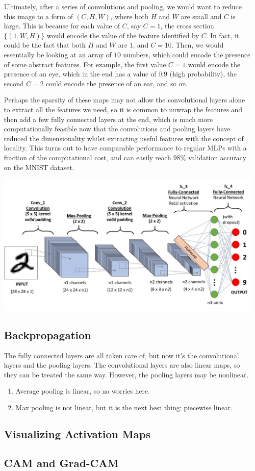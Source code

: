   Ultimately, after a series of convolutions and pooling, we would want to reduce this image to a form of $(C, H, W)$, where both $H$ and $W$ are small and $C$ is large. This is because for each value of $C$, say $C = 1$, the cross section $\{(1, W, H)\}$ would encode the value of the feature identified by $C$. In fact, it could be the fact that both $H$ and $W$ are $1$, and $C = 10$. Then, we would essentially be looking at an array of $10$ numbers, which could encode the presence of some abstract features. For example, the first value $C = 1$ would encode the presence of an eye, which in the end has a value of $0.9$ (high probability), the second $C = 2$ could encode the presence of an ear, and so on. 

  Perhaps the sparsity of these maps may not allow the convolutional layers alone to extract all the features we need, so it is common to unwrap the features and then add a few fully connected layers at the end, which is much more computationally feasible now that the convolutions and pooling layers have reduced the dimensionality whilst extracting useful features with the concept of locality. This turns out to have comparable performance to regular MLPs with a fraction of the computational cost, and can easily reach $98\%$ validation accuracy on the MNIST dataset. 

  \begin{center}
    \includegraphics[scale=0.25]{img/03_CNN/CNN_architecture.jpeg}
  \end{center}

\subsection{Backpropagation}

  The fully connected layers are all taken care of, but now it's the convolutional layers and the pooling layers. The convolutional layers are also linear maps, so they can be treated the same way. However, the pooling layers may be nonlinear. 
  \begin{enumerate}
    \item Average pooling is linear, so no worries here. 
    \item Max pooling is not linear, but it is the next best thing: piecewise linear. 
  \end{enumerate}

\subsection{Visualizing Activation Maps}

  \subsection{CAM and Grad-CAM}

